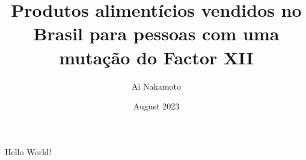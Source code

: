\documentclass{article}
\begin{document}
\title{Produtos alimentícios vendidos no Brasil para pessoas com uma mutação do Factor XII}
\author{Ai Nakamoto}
\date{August 2023}
\maketitle
Hello World!
\end{document}
